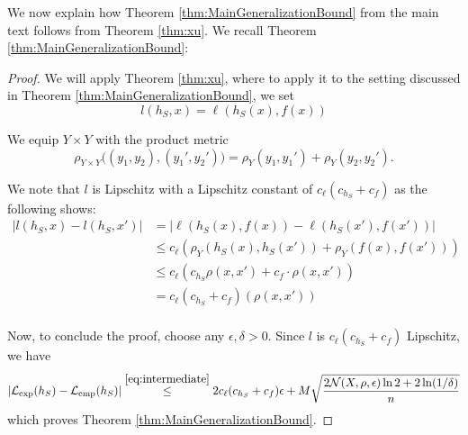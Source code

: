 We now explain how Theorem \ref{thm:MainGeneralizationBound} from the main text follows from Theorem \ref{thm:xu}. We recall Theorem \ref{thm:MainGeneralizationBound}:
\MainGeneralizationBound*
\begin{proof}
We will apply Theorem \ref{thm:xu}, where to apply it to
the setting discussed in Theorem \ref{thm:MainGeneralizationBound}, we set
$$l(h_S,x)=\ell(h_S(x),f(x))$$

We equip $Y\times Y$ with the product metric
\[
\rho_{Y\times Y}\big((y_1,y_2),(y_1',y_2')\big)
=
\rho_Y(y_1,y_1')+\rho_Y(y_2,y_2').
\]

We note that $l$ is Lipschitz with a Lipschitz constant of $c_\ell (c_{h_S}+c_f)$ as the following shows:
\begin{align*}
|l(h_S,x)-l(h_S,x')|&=|\ell(h_S(x),f(x))-\ell(h_S(x'),f(x'))|\\
&\leq c_\ell \left( \rho_Y(h_S(x),h_S(x'))+\rho_Y(f(x),f(x'))  \right)\\
&\leq c_\ell \left( c_{h_S}\rho(x,x')+c_f\cdot \rho(x,x')  \right)\\
& = c_\ell (c_{h_S}+c_f)( \rho(x,x'))\\
\end{align*}

Now, to conclude the proof, choose any $\epsilon,\delta>0$. Since $l$ is $c_\ell (c_{h_S}+c_f)$ Lipschitz, we have
\begin{align*}
|\mathcal{L}_{\mathrm{exp}}(h_S) - \mathcal{L}_{\mathrm{emp}}(h_S)|
&\stackrel{\eqref{eq:intermediate}}{\le} 2c_\ell (c_{h_S}+c_f) \epsilon + M \sqrt{\frac{2\mathcal{N}( X, \rho, \epsilon) \ln 2 + 2 \ln(1/\delta)}{n}}\\
\end{align*}
which proves Theorem \ref{thm:MainGeneralizationBound}.
\end{proof}

